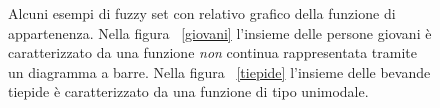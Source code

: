 \documentclass [11pt,a4paper,twoside,openright] {book}
\begin{document}
\begin{figure}[!h]
        \centering%
        \qquad\qquad
          \caption{Alcuni esempi di fuzzy set con relativo grafico della funzione di appartenenza. Nella figura \figurename~\ref{giovani} l'insieme delle persone giovani è caratterizzato da una funzione \emph{non} continua rappresentata tramite un diagramma a barre. Nella figura \figurename~\ref{tiepide} l'insieme delle bevande tiepide è caratterizzato da una funzione di tipo unimodale.}
\end{figure}
\end{document}
